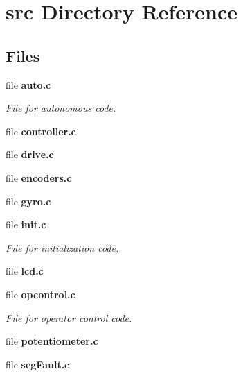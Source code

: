 \section{src Directory Reference}
\label{dir_68267d1309a1af8e8297ef4c3efbcdba}
\subsection*{Files}
\begin{DoxyCompactItemize}
\item 
file \textbf{ auto.\+c}
\begin{DoxyCompactList}\small\item\em File for autonomous code. \end{DoxyCompactList}\item 
file \textbf{ controller.\+c}
\item 
file \textbf{ drive.\+c}
\item 
file \textbf{ encoders.\+c}
\item 
file \textbf{ gyro.\+c}
\item 
file \textbf{ init.\+c}
\begin{DoxyCompactList}\small\item\em File for initialization code. \end{DoxyCompactList}\item 
file \textbf{ lcd.\+c}
\item 
file \textbf{ opcontrol.\+c}
\begin{DoxyCompactList}\small\item\em File for operator control code. \end{DoxyCompactList}\item 
file \textbf{ potentiometer.\+c}
\item 
file \textbf{ seg\+Fault.\+c}
\end{DoxyCompactItemize}
